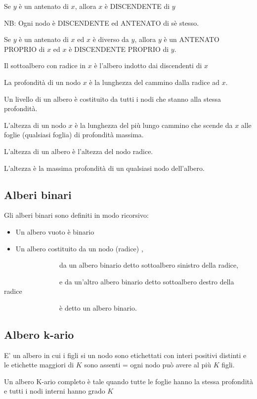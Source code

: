 \documentclass{article}
\providecommand{\tightlist}{%
  \setlength{\itemsep}{0pt}\setlength{\parskip}{0pt}}
\begin{document}
{{{{Se $y$ è un antenato di $x$, allora $x$ è DISCENDENTE di $y$}

{NB: Ogni nodo è DISCENDENTE ed ANTENATO di sè stesso.}

{Se $y$ è un antenato di $x$ ed $x$ è diverso da $y$, allora $y$ è un ANTENATO PROPRIO di $x$ ed $x$ è DISCENDENTE PROPRIO di $y$.}

{Il sottoalbero con radice in $x$ è l'albero indotto dai discendenti di $x$}

{La profondità di un nodo $x$ è la lunghezza del cammino dalla radice ad $x$.}

{Un livello di un albero è costituito da tutti i nodi che stanno alla stessa profondità. }

{L'altezza di un nodo $x$ è la lunghezza del più lungo cammino che scende da $x$ alle foglie (qualsiasi foglia) di profondità massima.}

{L'altezza di un albero è l'altezza del nodo radice.}

{L'altezza è la massima profondità di un qualsiasi nodo dell'albero.}

\subsection{Alberi binari}

{Gli alberi binari sono definiti in modo ricorsivo:}

\begin{itemize}
\tightlist
\item
  {Un albero vuoto è binario}
\item
  {Un albero costituito da un nodo (radice) ,}
\end{itemize}

{~~~~~~~~~~~~~~~~da un albero binario detto sottoalbero sinistro della
radice,}

{~~~~~~~~~~~~~~~~e da un'altro albero binario detto sottoalbero destro
della radice}

{~~~~~~~~~~~~~~~~è detto un albero binario.}

\subsection{Albero k-ario}

{E' un albero in cui i figli si un nodo sono etichettati con interi positivi distinti e le etichette maggiori di $K$ sono assenti = ogni nodo può avere al più $K$ figli.}

{Un albero K-ario completo è tale quando tutte le foglie hanno la stessa profondità e tutti i nodi interni hanno grado $K$}

}}}
\end{document}
